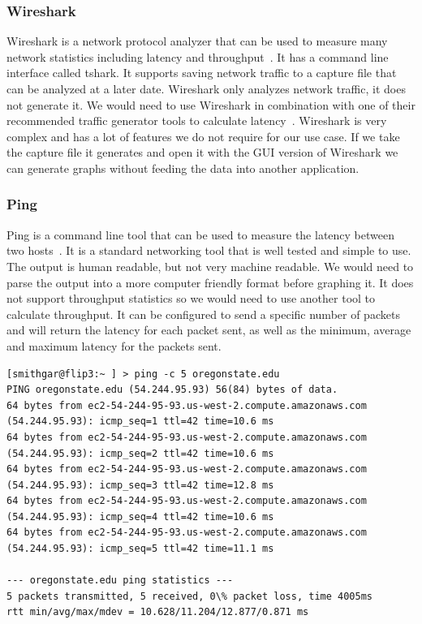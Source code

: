 \documentclass[10pt,letterpaper,onecolumn,draftclsnofoot]{IEEEtran}
\begin{document}
\subsubsection{Wireshark}
Wireshark is a network protocol analyzer that can be used to measure many network statistics including latency and throughput~\cite{wireshark}. 
It has a command line interface called tshark.
It supports saving network traffic to a capture file that can be analyzed at a later date.
Wireshark only analyzes network traffic, it does not generate it.
We would need to use Wireshark in combination with one of their recommended traffic generator tools to calculate latency~\cite{wireshark-tools}.
Wireshark is very complex and has a lot of features we do not require for our use case.
If we take the capture file it generates and open it with the GUI version of Wireshark we can generate graphs without feeding the data into another application.

\subsubsection{Ping}
Ping is a command line tool that can be used to measure the latency between two hosts~\cite{ping}.
It is a standard networking tool that is well tested and simple to use.
The output is human readable, but not very machine readable. 
We would need to parse the output into a more computer friendly format before graphing it.
It does not support throughput statistics so we would need to use another tool to calculate throughput.
It can be configured to send a specific number of packets and will return the latency for each packet sent, as well as the minimum, average and maximum latency for the packets sent.
\begin{lstlisting}[caption = Example ping usage, basicstyle=\ttfamily]
[smithgar@flip3:~ ] > ping -c 5 oregonstate.edu
PING oregonstate.edu (54.244.95.93) 56(84) bytes of data.
64 bytes from ec2-54-244-95-93.us-west-2.compute.amazonaws.com (54.244.95.93): icmp_seq=1 ttl=42 time=10.6 ms
64 bytes from ec2-54-244-95-93.us-west-2.compute.amazonaws.com (54.244.95.93): icmp_seq=2 ttl=42 time=10.6 ms
64 bytes from ec2-54-244-95-93.us-west-2.compute.amazonaws.com (54.244.95.93): icmp_seq=3 ttl=42 time=12.8 ms
64 bytes from ec2-54-244-95-93.us-west-2.compute.amazonaws.com (54.244.95.93): icmp_seq=4 ttl=42 time=10.6 ms
64 bytes from ec2-54-244-95-93.us-west-2.compute.amazonaws.com (54.244.95.93): icmp_seq=5 ttl=42 time=11.1 ms

--- oregonstate.edu ping statistics ---
5 packets transmitted, 5 received, 0\% packet loss, time 4005ms
rtt min/avg/max/mdev = 10.628/11.204/12.877/0.871 ms
\end{lstlisting}
\end{document}
